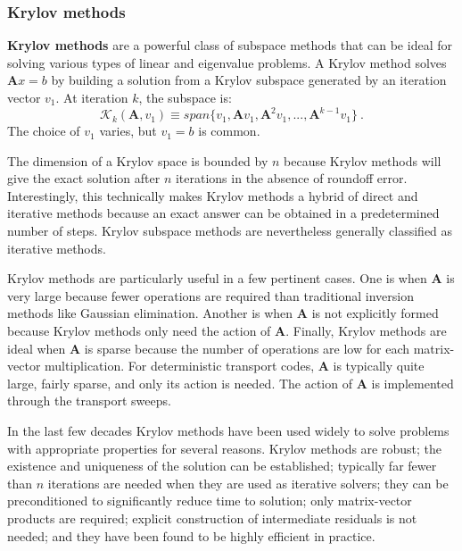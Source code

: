 \documentclass[12pt]{article}
\newcommand{\ve}[1]{\ensuremath{\mathbf{#1}}}
\begin{document}
\subsubsection*{Krylov methods}
\textbf{Krylov methods} are a powerful class of subspace methods that can be ideal for solving various types of linear and eigenvalue problems. A Krylov method solves $\ve{A}x = b$ by building a solution from a Krylov subspace generated by an iteration vector $v_{1}$. At iteration $k$, the subspace is:
%
\begin{equation}
  \mathcal{K}_{k}(\ve{A},v_{1}) \equiv span\{v_{1}, \ve{A}v_{1}, \ve{A}^{2}v_{1}, ..., \ve{A}^{k-1}v_{1}\} \:.
  \label{eq:Krylov-subspace}
\end{equation}
%
The choice of $v_{1}$ varies, but $v_{1} = b$ is common. %

The dimension of a Krylov space is bounded by $n$ because Krylov methods will give the exact solution after $n$ iterations in the absence of roundoff error. Interestingly, this technically makes Krylov methods a hybrid of direct and iterative methods because an exact answer can be obtained in a predetermined number of steps. Krylov subspace methods are nevertheless generally classified as iterative methods.%

Krylov methods are particularly useful in a few pertinent cases. One is when $\ve{A}$ is very large because fewer operations are required than traditional inversion methods like Gaussian elimination. Another is when $\ve{A}$ is not explicitly formed because Krylov methods only need the action of $\ve{A}$. Finally, Krylov methods are ideal when $\ve{A}$ is sparse because the number of operations are low for each matrix-vector multiplication. For deterministic transport codes, $\ve{A}$ is typically quite large, fairly sparse, and only its action is needed. The action of $\ve{A}$ is implemented through the transport sweeps.%

In the last few decades Krylov methods have been used widely to solve problems with appropriate properties for several reasons. Krylov methods are robust; the existence and uniqueness of the solution can be established; typically far fewer than $n$ iterations are needed when they are used as iterative solvers; they can be preconditioned to significantly reduce time to solution; only matrix-vector products are required; explicit construction of intermediate residuals is not needed; and they have been found to be highly efficient in practice.%
\end{document}
